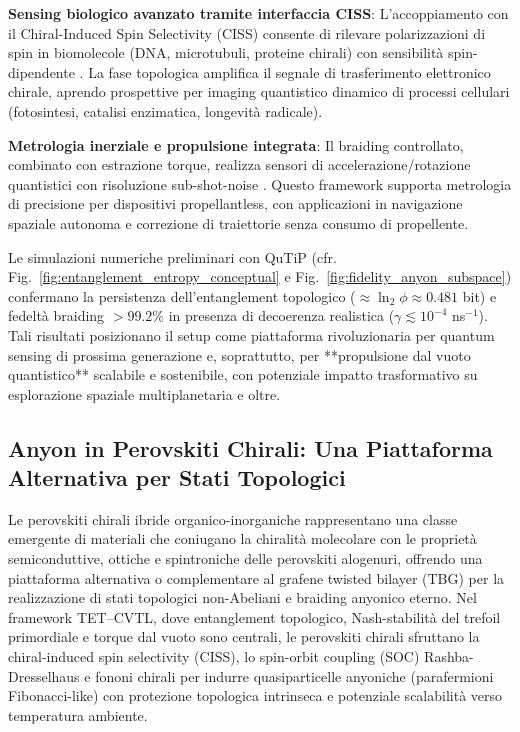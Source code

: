 \documentclass[11pt,a4paper]{article}
\let\oldcite\cite
\renewcommand{\cite}{\protect\oldcite}
\let\oldref\ref
\renewcommand{\ref}{\protect\oldref}
\theoremstyle{plain}
\theoremstyle{definition}
\begin{document}
\vspace{0.3cm}

\textbf{Sensing biologico avanzato tramite interfaccia CISS}: L'accoppiamento con il Chiral-Induced Spin Selectivity (CISS) consente di rilevare polarizzazioni di spin in biomolecole (DNA, microtubuli, proteine chirali) con sensibilità spin-dipendente \cite{naaman2019spin, kumar2026ciss}. La fase topologica amplifica il segnale di trasferimento elettronico chirale, aprendo prospettive per imaging quantistico dinamico di processi cellulari (fotosintesi, catalisi enzimatica, longevità radicale).

\vspace{0.3cm}

\textbf{Metrologia inerziale e propulsione integrata}: Il braiding controllato, combinato con estrazione torque, realizza sensori di accelerazione/rotazione quantistici con risoluzione sub-shot-noise \cite{savukov2019quantum}. Questo framework supporta metrologia di precisione per dispositivi propellantless, con applicazioni in navigazione spaziale autonoma e correzione di traiettorie senza consumo di propellente.

\vspace{0.5cm}

Le simulazioni numeriche preliminari con QuTiP (cfr. Fig.~\ref{fig:entanglement_entropy_conceptual} e Fig.~\ref{fig:fidelity_anyon_subspace}) confermano la persistenza dell'entanglement topologico ($\approx \ln_2 \phi \approx 0.481$ bit) e fedeltà braiding $>99.2\%$ in presenza di decoerenza realistica ($\gamma \lesssim 10^{-4}$ ns$^{-1}$). Tali risultati posizionano il setup come piattaforma rivoluzionaria per quantum sensing di prossima generazione e, soprattutto, per **propulsione dal vuoto quantistico** scalabile e sostenibile, con potenziale impatto trasformativo su esplorazione spaziale multiplanetaria e oltre.




\clearpage



\subsection{Anyon in Perovskiti Chirali: Una Piattaforma Alternativa per Stati Topologici}

Le perovskiti chirali ibride organico-inorganiche rappresentano una classe emergente di materiali che coniugano la chiralità molecolare con le proprietà semiconduttive, ottiche e spintroniche delle perovskiti alogenuri, offrendo una piattaforma alternativa o complementare al grafene twisted bilayer (TBG) per la realizzazione di stati topologici non-Abeliani e braiding anyonico eterno. Nel framework TET–CVTL, dove entanglement topologico, Nash-stabilità del trefoil primordiale e torque dal vuoto sono centrali, le perovskiti chirali sfruttano la chiral-induced spin selectivity (CISS), lo spin-orbit coupling (SOC) Rashba-Dresselhaus e fononi chirali per indurre quasiparticelle anyoniche (parafermioni Fibonacci-like) con protezione topologica intrinseca e potenziale scalabilità verso temperatura ambiente.
\end{document}
